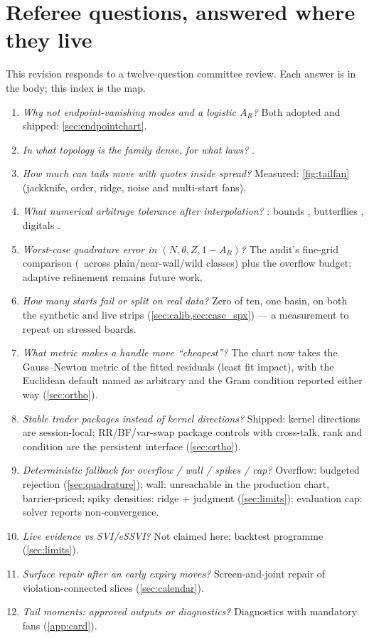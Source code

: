 \documentclass[11pt]{article}
\begin{document}
\section{Referee questions, answered where they live}
\label{app:referee}

This revision responds to a twelve-question committee review.  Each answer
is in the body; this index is the map.
\begin{enumerate}[leftmargin=1.6em,itemsep=1pt]
\item \emph{Why not endpoint-vanishing modes and a logistic $A_R$?}  Both
adopted and shipped: \cref{sec:endpointchart}.
\item \emph{In what topology is the family dense, for what laws?}
.
\item \emph{How much can tails move with quotes inside spread?}  Measured:
\cref{fig:tailfan} (jackknife, order, ridge, noise and multi-start fans).
\item \emph{What numerical arbitrage tolerance after interpolation?}
: bounds \lqdrefcertbounds, butterflies
\lqdrefcertfly, digitals \lqdrefcertdig.
\item \emph{Worst-case quadrature error in $(N,\theta,Z,1-A_R)$?}  The
audit's fine-grid comparison (\lqdrefcertfine\ across plain/near-wall/wild
classes) plus the overflow budget; adaptive refinement remains future work.
\item \emph{How many starts fail or split on real data?}  Zero of ten, one
basin, on both the synthetic and live strips (\cref{sec:calib,sec:case_spx})
--- a measurement to repeat on stressed boards.
\item \emph{What metric makes a handle move ``cheapest''?}  The chart now
takes the Gauss--Newton metric of the fitted residuals (least fit impact),
with the Euclidean default named as arbitrary and the Gram condition
reported either way (\cref{sec:ortho}).
\item \emph{Stable trader packages instead of kernel directions?}  Shipped:
kernel directions are session-local; RR/BF/var-swap package controls with
cross-talk, rank and condition are the persistent interface
(\cref{sec:ortho}).
\item \emph{Deterministic fallback for overflow / wall / spikes / cap?}
Overflow: budgeted rejection (\cref{sec:quadrature}); wall: unreachable in
the production chart, barrier-priced; spiky densities: ridge + judgment
(\cref{sec:limits}); evaluation cap: solver reports non-convergence.
\item \emph{Live evidence vs SVI/eSSVI?}  Not claimed here; backtest
programme (\cref{sec:limits}).
\item \emph{Surface repair after an early expiry moves?}  Screen-and-joint
repair of violation-connected slices (\cref{sec:calendar}).
\item \emph{Tail moments: approved outputs or diagnostics?}  Diagnostics
with mandatory fans (\cref{app:card}).
\end{enumerate}
\end{document}
